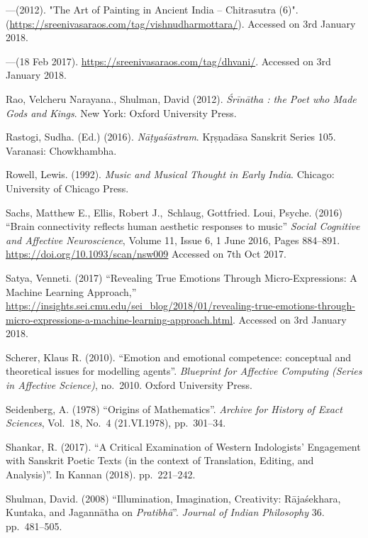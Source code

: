 \begin{thebibliography}{99}
---\kern3pt(2012). "The Art of Painting in Ancient India -- Chitrasutra (6)". (\url{https://sreenivasaraos.com/tag/vishnudharmottara/}). Accessed on 3rd January 2018.

---\kern3pt(18 Feb 2017). \url{https://sreenivasaraos.com/tag/dhvani/}. Accessed on 3rd January 2018.

Rao, Velcheru Narayana., Shulman, David (2012). \textsl{Śrīnātha : the Poet who Made Gods and Kings}. New York: Oxford University Press.

Rastogi, Sudha. (Ed.) (2016). \textsl{Nāṭyaśāstram}. Kṛṣṇadāsa Sanskrit Series 105. Varanasi: Chowkhambha.

Rowell, Lewis. (1992). \textsl{Music and Musical Thought in Early India}. Chicago: University of Chicago Press.

Sachs, Matthew E., Ellis, Robert J., Schlaug, Gottfried. Loui, Psyche. (2016) “Brain connectivity reflects human aesthetic responses to music” \textsl{Social Cognitive and Affective Neuroscience}, Volume 11, Issue 6, 1 June 2016, Pages 884--891. \url{https://doi.org/10.1093/scan/nsw009} Accessed on 7th Oct 2017.

Satya, Venneti. (2017) “Revealing True Emotions Through Micro-Expressions: A Machine Learning Approach,” \url{https://insights.sei.cmu.edu/sei_blog/2018/01/revealing-true-emotions-through-micro-expressions-a-machine-learning-approach.html}. Accessed on 3rd January 2018.

Scherer, Klaus R. (2010). “Emotion and emotional competence: conceptual and theoretical issues for modelling agents”. \textsl{Blueprint for Affective Computing (Series in Affective Science)}, no.~2010. Oxford University Press.

Seidenberg, A. (1978) “Origins of Mathematics”. \textsl{Archive for History of Exact Sciences}, Vol.~18, No.~4 (21.VI.1978), pp.~301--34.

Shankar, R. (2017). “A Critical Examination of Western Indologists’ Engagement with Sanskrit Poetic Texts (in the context of Translation, Editing, and Analysis)”. In Kannan (2018). pp.~221--242.

Shulman, David. (2008) “Illumination, Imagination, Creativity: Rājaśekhara, Kuntaka, and Jagannātha on \textsl{Pratibhā}”.  \textsl{Journal of Indian Philosophy} 36. pp.~481--505.


\end{thebibliography}
